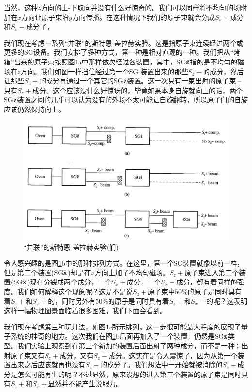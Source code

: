 \documentclass[UTF8,twoside]{ctexart}
\begin{document}
当然，这种$z$方向的上-下取向并没有什么好惊奇的。我们可以同样将不均匀的场附加在$x$方向让原子束沿$y$方向传播。在这种情况下我们的原子束就会分成$S_x+$成分和$S_x-$成分了。\\


\noindent 我们现在考虑一系列“并联”的斯特恩-盖拉赫实验。这是指原子束连续经过两个或更多的SG设备。我们安排了多种方式，第一种是相对直观的一种。我们把从“烤箱”出来的原子束按照图{\ref{Fig1.3}}a中那样依次经过各装置，其中，SG${\hat{\bf z}}$指的是不均匀的磁场在$z$方向。我们如图一样挡住经过第一个SG 装置出来的那些$S_z-$的成分，然后让那些$S_z+$的成分再通过一个其它的SG${\hat{\bf z}}$装置。这一次只有一束出射的原子束 -- 只有$S_z+$成分。这个应该没什么好惊讶的，毕竟如果本身自旋就向上的话，两个SG$\hat{\bf z}$装置之间的几乎可以认为没有的外场不太可能让自旋翻转，所以原子们的自旋应该仍然保持向上。

\begin{figure}
\begin{centering}
\includegraphics[width = 12cm]{./Sakurai/Fig_1.3.png}
\caption{“并联”的斯特恩-盖拉赫实验(们)}
\label {Fig1.3}
\end{centering}
\end{figure}

令人感兴趣的是图{\ref{Fig1.3}}b中的那种排列方式。在这里，第一个SG装置就像以前一样，但是第二个装置(SG$\hat{\bf x}$)却是在$x$方向上加了不均匀磁场。$S_z+$原子束进入第二个装置(SG$\hat{\bf x}$)现在分裂成两个成分，一个$S_x+$成分，一个$S_x-$成分，都有着同样的强度。我们如何解释这个现象呢？这是不是说$S_z+$原子束中$50\%$的原子是同时具有着$S_z+$和$S_x+$的，同时另外有$50\%$的原子是同时具有着$S_z+$和$S_x-$的呢？这表明这样一幅物理图景面临着很多困难，我们下面会看到。

我们现在考虑第三种玩儿法，如图\ref{Fig1.3}c所示排列。这一步很可能最大程度的展现了量子系统的神奇的地方。这次我们在图{\ref{Fig1.3}}b后面再加入了一个装置，仍然是SG$\hat{\bf z}$类型。我们实验上观察到在第三个新加的装置后面出射了{\textbf{两}}种成分，而不是一种；出射原子束又有$S_z+$成分，又有$S_z-$成分。这实在是令人震惊了，因为从第一个装置出来之后应该就再也没有$S_z-$的成分了。我们想法中一开始就被消除的$S_z-$成分是怎么可能再生的呢？不过显然，原来设想的进入第三个装置的原子束是同时具有$S_z+$和$S_x+$显然并不能产生说服力。
\end{document}

